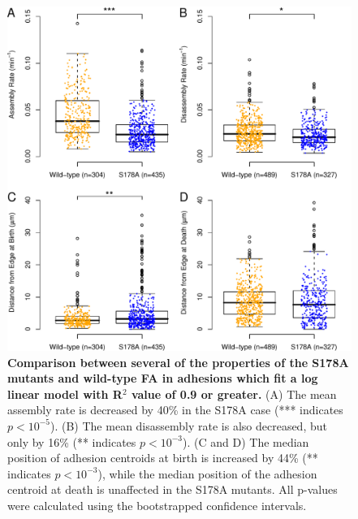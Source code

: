 \begin{figure}[htbp]
\begin{center}
\includegraphics[width=\textwidth]{../figures/S178A/S178A_vs_wild-type}
\end{center}
\caption{
{\bf Comparison between several of the properties of the S178A mutants and
wild-type FA in adhesions which fit a log linear model with R$^2$ value of 0.9
or greater.} (A) The mean assembly rate is decreased by 40\% in the S178A case
(*** indicates $p<10^{-5}$). (B) The mean disassembly rate is also decreased,
but only by 16\% (** indicates $p<10^{-3}$). (C and D) The median position of
adhesion centroids at birth is increased by 44\% (** indicates $p<10^{-3}$),
while the median position of the adhesion centroid at death is unaffected in the
S178A mutants. All p-values were calculated using the bootstrapped
confidence intervals.  }
\label{S178A}
\end{figure}

